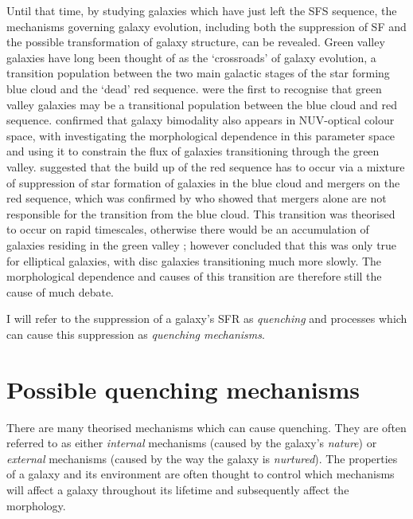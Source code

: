 Until that time, by studying galaxies which have just left the SFS sequence, the mechanisms governing galaxy evolution, including both the suppression of SF and the possible transformation of galaxy structure, can be revealed. Green valley galaxies have long been thought of as the `crossroads' of galaxy evolution, a transition population between the two main galactic stages of the star forming blue cloud and the `dead' red sequence. \citet{Bell04} were the first to recognise that green valley galaxies may be a transitional population between the blue cloud and red sequence. \citet{Wyder07} confirmed that galaxy bimodality also appears in NUV-optical colour space, with \citet{Schim07} investigating the morphological dependence in this parameter space and \citet{Martin07} using it to constrain the flux of galaxies transitioning through the green valley. \citet{Faber07} suggested that the build up of the red sequence has to occur via a mixture of suppression of star formation of galaxies in the blue cloud and mergers on the red sequence, which was confirmed by \citet{Mendez11} who showed that mergers alone are not responsible for the transition from the blue cloud. This transition was theorised to occur on rapid timescales, otherwise there would be an accumulation of galaxies residing in the green valley \citep{Gonc12}; however \citet{schawinski14} concluded that this was only true for elliptical galaxies, with disc galaxies transitioning much more slowly. The morphological dependence and causes of this transition are therefore still the cause of much debate. 


I will refer to the suppression of a galaxy's SFR as \emph{quenching} and processes which can cause this suppression as \emph{quenching mechanisms}. 

\section{Possible quenching mechanisms}\label{sec:quenchmech}

There are many theorised mechanisms which can cause quenching. They are often referred to as either \emph{internal} mechanisms (caused by the galaxy's \emph{nature}) or \emph{external} mechanisms (caused by the way the galaxy is \emph{nurtured}). The properties of a galaxy and its environment are often thought to control which mechanisms will affect a galaxy throughout its lifetime and subsequently affect the morphology. 

